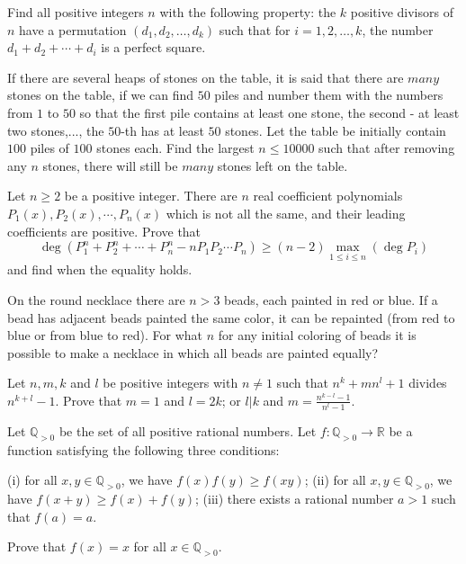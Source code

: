 \documentclass[11pt]{scrartcl}
\begin{document}
\begin{problem}[297274918587198]
	Find all positive integers $n$ with the following property: the $k$ positive divisors of $n$ have a permutation $(d_1,d_2,\ldots,d_k)$ such that for $i=1,2,\ldots,k$, the number $d_1+d_2+\cdots+d_i$ is a perfect square.
\end{problem}
\begin{problem}[6955756846906975678]
If there are several heaps of stones on the table, it is said that there are $\textit{many}$ stones on the table, if we can find $50$ piles and number them with the numbers from $1$ to $50$ so that the first pile contains at least one stone, the second - at least two stones,..., the $50$-th has at least $50$ stones. Let the table be initially contain $100$ piles of $100$ stones each. Find the largest $n \leq 10 000$ such that after removing any $n$ stones, there will still be $\textit{many}$ stones left on the table.
\end{problem}
\begin{problem}[604188725177670]
	Let $n\ge 2$ be a positive integer. There are $n$ real coefficient polynomials $P_1(x),P_2(x),\cdots ,P_n(x)$ which is not all the same, and their leading coefficients are positive. Prove that
$$\deg(P_1^n+P_2^n+\cdots +P_n^n-nP_1P_2\cdots P_n)\ge (n-2)\max_{1\le i\le n}(\deg P_i)$$and find when the equality holds.
\end{problem}
\begin{problem}[6975633259976638169]
On the round necklace there are $n> 3$ beads, each painted in red or blue. If a bead has adjacent beads painted the same color, it can be repainted (from red to blue or from blue to red). For what $n$ for any initial coloring of beads it is possible to make a necklace in which all beads are painted equally?
\end{problem}
\begin{problem}[5341232263014748696]
Let $n, m, k$ and $l$ be positive integers with $n \neq 1$ such that $n^k + mn^l + 1$ divides $n^{k+l} - 1$. Prove that
$m = 1$ and $l = 2k$; or
$l|k$ and $m = \frac{n^{k-l}-1}{n^l-1}$.
\end{problem}
\begin{problem}[658315898528816725]
	Let $\mathbb Q_{>0}$ be the set of all positive rational numbers. Let $f:\mathbb Q_{>0}\to\mathbb R$ be a function satisfying the following three conditions:

(i) for all $x,y\in\mathbb Q_{>0}$, we have $f(x)f(y)\geq f(xy)$;
(ii) for all $x,y\in\mathbb Q_{>0}$, we have $f(x+y)\geq f(x)+f(y)$;
(iii) there exists a rational number $a>1$ such that $f(a)=a$.

Prove that $f(x)=x$ for all $x\in\mathbb Q_{>0}$.
\end{problem}
\end{document}
